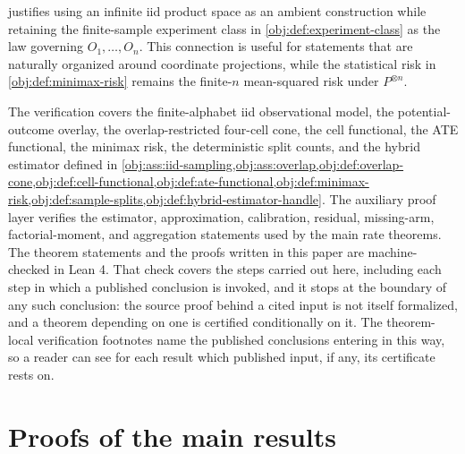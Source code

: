 \documentclass[11pt]{article}
\begin{document}
 justifies using an infinite iid product space as an ambient construction while retaining the finite-sample experiment class in \cref{obj:def:experiment-class} as the law governing \(O_1,\ldots,O_n\). This connection is useful for statements that are naturally organized around coordinate projections, while the statistical risk in \cref{obj:def:minimax-risk} remains the finite-\(n\) mean-squared risk under \(P^{\otimes n}\).

The verification covers the finite-alphabet iid observational model, the potential-outcome overlay, the overlap-restricted four-cell cone, the cell functional, the ATE functional, the minimax risk, the deterministic split counts, and the hybrid estimator defined in \cref{obj:ass:iid-sampling,obj:ass:overlap,obj:def:overlap-cone,obj:def:cell-functional,obj:def:ate-functional,obj:def:minimax-risk,obj:def:sample-splits,obj:def:hybrid-estimator-handle}. The auxiliary proof layer verifies the estimator, approximation, calibration, residual, missing-arm, factorial-moment, and aggregation statements used by the main rate theorems. The theorem statements and the proofs written in this paper are machine-checked in Lean 4. That check covers the steps carried out here, including each step in which a published conclusion is invoked, and it stops at the boundary of any such conclusion: the source proof behind a cited input is not itself formalized, and a theorem depending on one is certified conditionally on it. The theorem-local verification footnotes name the published conclusions entering in this way, so a reader can see for each result which published input, if any, its certificate rests on.


\section{Proofs of the main results}\label{sec:deferred-proofs}
\end{document}
